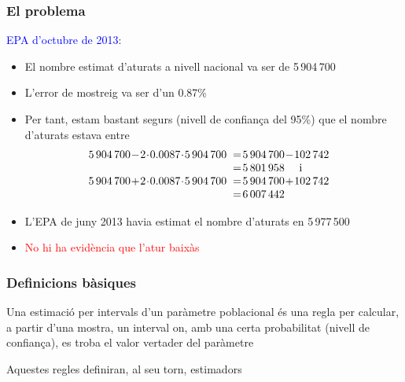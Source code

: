 \documentclass[12pt,t]{beamer}
\newcommand{\red}[1]{\textcolor{red}{#1}}
\newcommand{\blue}[1]{\textcolor{blue}{#1}}
\renewcommand{\emph}[1]{{\color{red}#1}}
\theoremstyle{plain}
\theoremstyle{definition}
\begin{document}
\begin{frame}
\frametitle{El problema}
\vspace*{-2ex}

\blue{EPA d'octubre de 2013}: \smallskip
\begin{itemize}
\item El nombre estimat d'aturats a nivell nacional va ser de 5\,904\,700 \smallskip

\item L'error de mostreig va ser d'un 0.87\% \smallskip

\item Per tant, estam bastant segurs (nivell de confiança del 95\%) que el nombre d'aturats estava entre
$$
\begin{array}{rl}
\hspace*{-2ex} 5\,904\,700\!-\! 2\!\cdot \! 0.0087\!\cdot\! 5\,904\,700 & \hspace*{-1ex}=\! 5\,904\,700\!-\! 102\,742\\ &  \hspace*{-1ex}=\! 5\,801\,958\quad \mbox{ i}\\
\hspace*{-2ex} 5\,904\,700\!+\!2\!\cdot\! 0.0087\!\cdot\! 5\,904\,700 & \hspace*{-1ex}=\! 5\,904\,700\!+\! 102\,742\\ & \hspace*{-1ex}=\! 6\,007\,442
 \end{array}
 $$
 
 \item L'EPA de juny 2013 havia estimat el nombre d'aturats en 5\,977\,500
 \smallskip
 
 \item \red{No hi ha evidència que l'atur baixàs}
 \end{itemize}
\end{frame}







\begin{frame}
\frametitle{Definicions bàsiques}

Una \emph{estimació per intervals} d'un paràmetre poblacional és una regla per calcular, a partir d'una mostra, un interval on, amb una certa probabilitat (\emph{nivell de confiança}), es troba el  valor vertader del paràmetre
\bigskip

Aquestes regles definiran, al seu torn, \emph{estimadors}

\end{frame}
\end{document}
